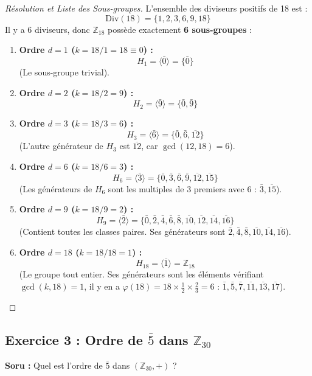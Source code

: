 \documentclass[12pt,a4paper]{report}
\begin{document}
\begin{proof}[Résolution et Liste des Sous-groupes]
L'ensemble des diviseurs positifs de 18 est :
\[ \text{Div}(18) = \{1, 2, 3, 6, 9, 18\} \]
Il y a 6 diviseurs, donc $\mathbb{Z}_{18}$ possède exactement \textbf{6 sous-groupes} :

\begin{enumerate}
    \item \textbf{Ordre $d = 1$ ($k = 18/1 = 18 \equiv 0$) :}
    \[ H_1 = \langle \bar{0} \rangle = \{\bar{0}\} \]
    (Le sous-groupe trivial).
    
    \item \textbf{Ordre $d = 2$ ($k = 18/2 = 9$) :}
    \[ H_2 = \langle \bar{9} \rangle = \{\bar{0}, \bar{9}\} \]
    
    \item \textbf{Ordre $d = 3$ ($k = 18/3 = 6$) :}
    \[ H_3 = \langle \bar{6} \rangle = \{\bar{0}, \bar{6}, \overline{12}\} \]
    (L'autre générateur de $H_3$ est $\overline{12}$, car $\gcd(12, 18) = 6$).
    
    \item \textbf{Ordre $d = 6$ ($k = 18/6 = 3$) :}
    \[ H_6 = \langle \bar{3} \rangle = \{\bar{0}, \bar{3}, \bar{6}, \bar{9}, \overline{12}, \overline{15}\} \]
    (Les générateurs de $H_6$ sont les multiples de 3 premiers avec 6 : $\bar{3}, \overline{15}$).
    
    \item \textbf{Ordre $d = 9$ ($k = 18/9 = 2$) :}
    \[ H_9 = \langle \bar{2} \rangle = \{\bar{0}, \bar{2}, \bar{4}, \bar{6}, \bar{8}, \overline{10}, \overline{12}, \overline{14}, \overline{16}\} \]
    (Contient toutes les classes paires. Ses générateurs sont $\bar{2}, \bar{4}, \bar{8}, \overline{10}, \overline{14}, \overline{16}$).
    
    \item \textbf{Ordre $d = 18$ ($k = 18/18 = 1$) :}
    \[ H_{18} = \langle \bar{1} \rangle = \mathbb{Z}_{18} \]
    (Le groupe tout entier. Ses générateurs sont les éléments vérifiant $\gcd(k, 18) = 1$, il y en a $\varphi(18) = 18 \times \frac{1}{2} \times \frac{2}{3} = 6$ : $\bar{1}, \bar{5}, \bar{7}, \overline{11}, \overline{13}, \overline{17}$).
\end{enumerate}
\end{proof}

\vspace{0.5cm}

\subsection*{Exercice 3 : Ordre de $\bar{5}$ dans $\mathbb{Z}_{30}$}
\textbf{Soru :} Quel est l'ordre de $\bar{5}$ dans $(\mathbb{Z}_{30}, +)$ ?
\end{document}
